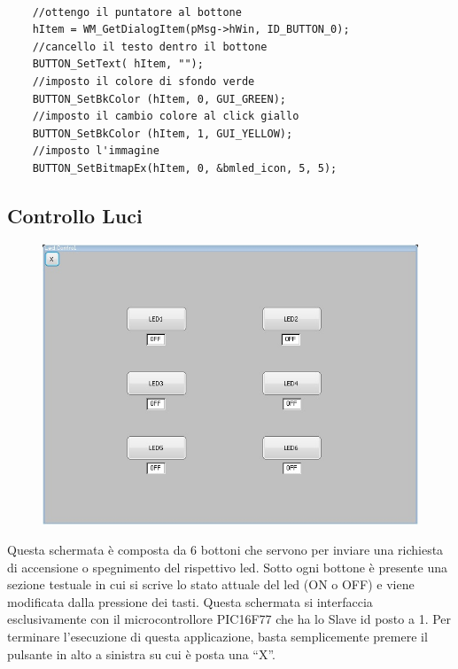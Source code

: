 \documentclass[a4paper,titlepage]{book}
\begin{document}
\begin{lstlisting}

    //ottengo il puntatore al bottone
    hItem = WM_GetDialogItem(pMsg->hWin, ID_BUTTON_0);
    //cancello il testo dentro il bottone
    BUTTON_SetText( hItem, "");
    //imposto il colore di sfondo verde
    BUTTON_SetBkColor (hItem, 0, GUI_GREEN);
    //imposto il cambio colore al click giallo 
    BUTTON_SetBkColor (hItem, 1, GUI_YELLOW);
    //imposto l'immagine
    BUTTON_SetBitmapEx(hItem, 0, &bmled_icon, 5, 5);

\end{lstlisting} 

\newpage
\subsection{Controllo Luci}

\begin{figure}[!ht]
\centering
\includegraphics[scale=0.6]{ledgui.jpg}
\end{figure}

Questa schermata è composta da 6 bottoni che servono per inviare una richiesta di accensione o spegnimento del rispettivo led. Sotto ogni bottone è presente una sezione testuale in cui si scrive lo stato attuale del led (ON o OFF) e viene modificata dalla pressione dei tasti. Questa schermata si interfaccia esclusivamente con il microcontrollore PIC16F77 che ha lo Slave id posto a 1. Per terminare l'esecuzione di questa applicazione, basta semplicemente premere il pulsante in alto a sinistra su cui è posta una ``X''.

~
\end{document}
